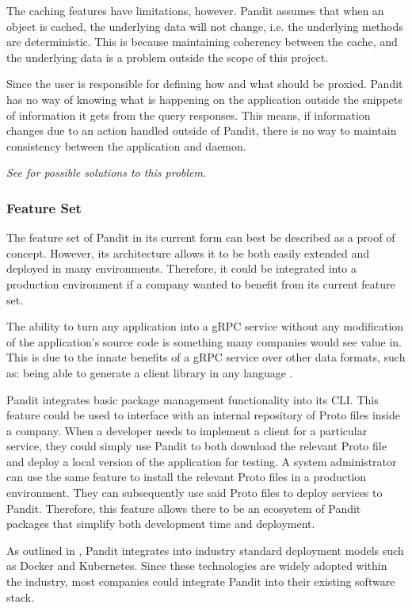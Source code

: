 \documentclass[a4paper,12pt]{report}
\begin{document}
The caching features have limitations, however. Pandit assumes that when an object is cached, the underlying data will not change, i.e. the underlying methods are deterministic. This is because maintaining coherency between the cache, and the underlying data is a problem outside the scope of this project.

Since the user is responsible for defining how and what should be proxied. Pandit has no way of knowing what is happening on the application outside the snippets of information it gets from the query responses. 
This means, if information changes due to an action handled outside of Pandit, there is no way to maintain consistency between the application and daemon.

\textit{See  for possible solutions to this problem.}

\subsubsection{Feature Set}
The feature set of Pandit in its current form can best be described as a proof of concept.
However, its architecture allows it to be both easily extended and deployed in many environments.
Therefore, it could be integrated into a production environment if a company wanted to benefit from its current feature set.

The ability to turn any application into a gRPC service without any modification of the application's source code is something many companies would see value in.
This is due to the innate benefits of a gRPC service over other data formats, such as:
being able to generate a client library in any language \cite{codegen}. 

Pandit integrates basic package management functionality into its CLI. 
This feature could be used to interface with an internal repository of Proto files inside a company.
When a developer needs to implement a client for a particular service, they could simply use Pandit to both download the relevant Proto file 
and deploy a local version of the application for testing.
A system administrator can use the same feature to install the relevant Proto files in a production environment. 
They can subsequently use said Proto files to deploy services to Pandit.
Therefore, this feature allows there to be an ecosystem of Pandit packages that simplify both development time and deployment.

As outlined in , Pandit integrates into industry standard deployment models \cite{share} such as Docker and Kubernetes. 
Since these technologies are widely adopted within the industry, most companies could integrate Pandit into their existing software stack.
\end{document}
